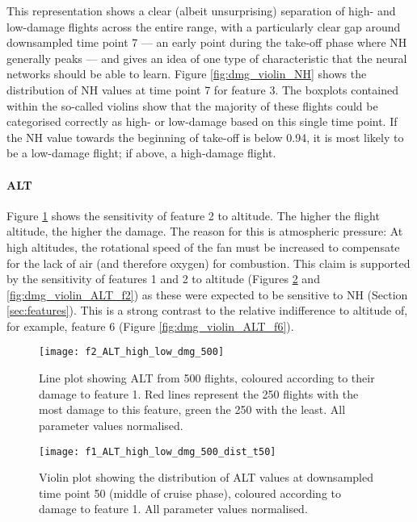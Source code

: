 This representation shows a clear (albeit unsurprising) separation of high- and low-damage flights across the entire range, with a particularly clear gap around downsampled time point 7 --- an early point during the take-off phase where NH generally peaks --- and gives an idea of one type of characteristic that the neural networks should be able to learn. Figure \ref{fig:dmg_violin_NH} shows the distribution of NH values at time point 7 for feature 3. The boxplots contained within the so-called violins show that the majority of these flights could be categorised correctly as high- or low-damage based on this single time point. If the NH value towards the beginning of take-off is below 0.94, it is most likely to be a low-damage flight; if above, a high-damage flight.

\paragraph{ALT}
Figure \ref{fig:high_low_dmg_ALT} shows the sensitivity of feature 2 to altitude. The higher the flight altitude, the higher the damage. The reason for this is atmospheric pressure: At high altitudes, the rotational speed of the fan must be increased to compensate for the lack of air (and therefore oxygen) for combustion. This claim is supported by the sensitivity of features 1 and 2 to altitude (Figures \ref{fig:dmg_violin_ALT_f1} and \ref{fig:dmg_violin_ALT_f2}) as these were expected to be sensitive to NH (Section \ref{sec:features}). This is a strong contrast to the relative indifference to altitude of, for example, feature 6 (Figure \ref{fig:dmg_violin_ALT_f6}).

\begin{figure}
    \centering
    \texttt{[image: f2\_ALT\_high\_low\_dmg\_500]}
    \caption{\label{fig:high_low_dmg_ALT} Line plot showing ALT from 500 flights, coloured according to their damage to feature 1. Red lines represent the 250 flights with the most damage to this feature, green the 250 with the least. All parameter values normalised.}
\end{figure}

\begin{figure}
    \centering
    \texttt{[image: f1\_ALT\_high\_low\_dmg\_500\_dist\_t50]}
    \caption{\label{fig:dmg_violin_ALT_f1} Violin plot showing the distribution of ALT values at downsampled time point 50 (middle of cruise phase), coloured according to damage to feature 1. All parameter values normalised.}
\end{figure}

